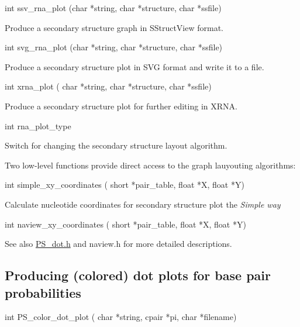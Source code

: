 \begin{DoxyVerb}int ssv_rna_plot (char *string,
                  char *structure,
                  char *ssfile)
\end{DoxyVerb}
 Produce a secondary structure graph in S\+Struct\+View format.

\begin{DoxyVerb}int svg_rna_plot (char *string,
                  char *structure,
                  char *ssfile)
\end{DoxyVerb}
 Produce a secondary structure plot in S\+VG format and write it to a file.

\begin{DoxyVerb}int xrna_plot ( char *string,
                char *structure,
                char *ssfile)
\end{DoxyVerb}
 Produce a secondary structure plot for further editing in X\+R\+NA.

\begin{DoxyVerb}int rna_plot_type
\end{DoxyVerb}
 Switch for changing the secondary structure layout algorithm.

Two low-\/level functions provide direct access to the graph lauyouting algorithms\+:

\begin{DoxyVerb}int simple_xy_coordinates ( short *pair_table,
                            float *X,
                            float *Y)
\end{DoxyVerb}
 Calculate nucleotide coordinates for secondary structure plot the {\itshape Simple way}

\begin{DoxyVerb}int naview_xy_coordinates ( short *pair_table,
                            float *X,
                            float *Y)
\end{DoxyVerb}


\begin{DoxySeeAlso}{See also}
\hyperlink{PS__dot_8h}{P\+S\+\_\+dot.\+h} and naview.\+h for more detailed descriptions.
\end{DoxySeeAlso}
\hypertarget{plots_utils_dot}{}\subsection{Producing (colored) dot plots for base pair probabilities}\label{plots_utils_dot}
\begin{DoxyVerb}int PS_color_dot_plot ( char *string,
                        cpair *pi,
                        char *filename)
\end{DoxyVerb}


